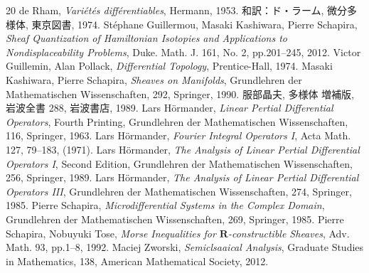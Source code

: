 \documentclass[leqno, 10pt, a4paper, dvipdfmx]{jsarticle}
\theoremstyle{definition}
\newcommand{\rr}{\mathbf{R}}
\numberwithin{equation}{section}
\theoremstyle{mystyle}
\begin{document}
\begin{thebibliography}{20} 
  de Rham, \textit{Vari\'et\'es diff\'erentiables}, Hermann, 1953.
  和訳：ド・ラーム, 微分多様体, 東京図書, 1974.
   St\'ephane Guillermou, 
  Masaki Kashiwara, Pierre Schapira, 
  \textit{Sheaf Quantization of Hamiltonian Isotopies and Applications to Nondisplaceability Problems}, 
  Duke. Math. J. 161, No. 2, pp.201--245, 2012.  
   Victor Guillemin, Alan Pollack, 
    \textit{Differential Topology}, 
    Prentice-Hall, 1974.
   Masaki Kashiwara, Pierre Schapira, 
    \textit{Sheaves on Manifolds}, 
    Grundlehren der Mathematischen Wissenschaften, 292, Springer, 1990.
   服部晶夫, 多様体 増補版, 岩波全書 288, 岩波書店, 1989.
   Lars H\"ormander, 
  \textit{Linear Pertial Differential Operators}, Fourth Printing, 
  Grundlehren der Mathematischen Wissenschaften, 116, Springer, 1963.
   Lars H\"ormander, 
  \textit{Fourier Integral Operators I}, 
  Acta Math. 127, 79--183, (1971).
   Lars H\"ormander, 
  \textit{The Analysis of Linear Pertial Differential Operators I}, Second Edition,
  Grundlehren der Mathematischen Wissenschaften, 256, Springer, 1989.
   Lars H\"ormander, 
  \textit{The Analysis of Linear Pertial Differential Operators III}, 
  Grundlehren der Mathematischen Wissenschaften, 274, Springer, 1985.
   Pierre Schapira, 
    \textit{Microdifferential Systems in the Complex Domain}, 
    Grundlehren der Mathematischen Wissenschaften, 269, 
    Springer, 1985.
     Pierre Schapira, Nobuyuki Tose, 
    \textit{Morse Inequalities for \(\rr\)-constructible Sheaves}, 
    Adv. Math. 93, pp.1--8, 1992. 
     Maciej Zworski,
    \textit{Semiclsaaical Analysis}, 
    Graduate Studies in Mathematics, 138, 
    American Mathematical Society, 
    2012. 
\end{thebibliography}

\end{document}
